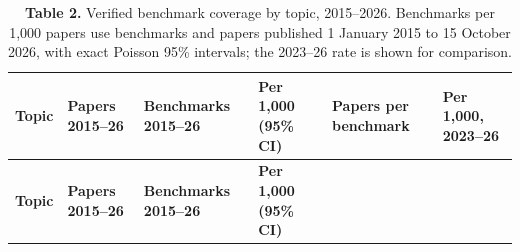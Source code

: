 \documentclass{article}
\begin{document}
\begin{longtable}[l]{@{}
  >{\raggedright\arraybackslash}p{}
  >{\raggedright\arraybackslash}p{}
  >{\raggedright\arraybackslash}p{}
  >{\raggedright\arraybackslash}p{}
  >{\raggedright\arraybackslash}p{}
  >{\raggedright\arraybackslash}p{}@{}}
\caption{\textbf{Table 2.} Verified benchmark coverage by topic, 2015--2026.
Benchmarks per 1,000 papers use benchmarks and papers published 1
January 2015 to 15 October 2026, with exact Poisson 95\% intervals; the
2023--26 rate is shown for comparison.}\tabularnewline
\toprule
\begin{minipage}[b]{\linewidth}\raggedright
\textbf{Topic}
\end{minipage} & \begin{minipage}[b]{\linewidth}\raggedright
\textbf{Papers 2015--26}
\end{minipage} & \begin{minipage}[b]{\linewidth}\raggedright
\textbf{Benchmarks 2015--26}
\end{minipage} & \begin{minipage}[b]{\linewidth}\raggedright
\textbf{Per 1,000 (95\% CI)}
\end{minipage} & \begin{minipage}[b]{\linewidth}\raggedright
\textbf{Papers per benchmark}
\end{minipage} & \begin{minipage}[b]{\linewidth}\raggedright
\textbf{Per 1,000, 2023--26}
\end{minipage} \\
\midrule
\endfirsthead
\toprule
\begin{minipage}[b]{\linewidth}\raggedright
\textbf{Topic}
\end{minipage} & \begin{minipage}[b]{\linewidth}\raggedright
\textbf{Papers 2015--26}
\end{minipage} & \begin{minipage}[b]{\linewidth}\raggedright
\textbf{Benchmarks 2015--26}
\end{minipage} & \begin{minipage}[b]{\linewidth}\raggedright
\textbf{Per 1,000 (95\% CI)}
\end{minipage} & \begin{minipage}[b]{\linewidth}\raggedright

\end{minipage}
\end{longtable}
\end{document}
